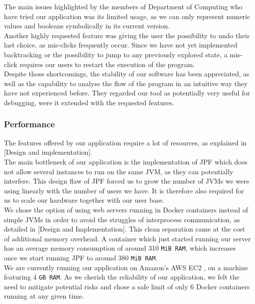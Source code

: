 \documentclass[titlepage,11pt]{article}
\begin{document}
\noindent The main issues highlighted by the members of Department of Computing who have tried our application was its limited usage, as we can only represent numeric values and booleans symbolically in its current version. \\

\noindent Another highly requested feature was giving the user the possibility to undo their last choice, as mis-clicks frequently occur. Since we have not yet implemented backtracking or the possibility to jump to any previously explored state, a mis-click requires our users to restart the execution of the program. \\

\noindent Despite those shortcomings, the stability of our software has been appreciated, as well as the capability to analyse the flow of the program in an intuitive way they have not experienced before. They regarded our tool as potentially very useful for debugging, were it extended with the requested features.

\subsubsection{Performance}

The features offered by our application require a lot of resources, as explained in [Design and implementation]. \\

\noindent The main bottleneck of our application is the implementation of JPF which does not allow several instances to run on the same JVM, as they can potentially interfere. This design flaw of JPF forced us to grow the number of JVMs we were using linearly with the number of users we have. It is therefore also required for us to scale our hardware together with our user base. \\

We chose the option of using web servers running in Docker containers instead of simple JVMs in order to avoid the struggles of interprocess communication, as detailed in [Design and Implementation]. This clean separation came at the cost of additional memory overhead. A container which just started running our server has an average memory consumption of around 310 \texttt{MiB RAM}, which increases once we start running JPF to around 380 \texttt{MiB RAM}. \\

We are currently running our application on Amazon's AWS EC2 \cite{aws}, on a machine featuring 4 \texttt{GB RAM}. As we cherish the reliability of our application, we felt the need to mitigate potential risks and chose a safe limit of only 6 Docker containers running at any given time. \\
\end{document}
